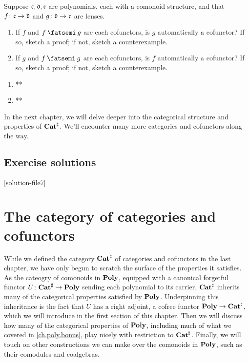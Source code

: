 \documentclass[Book-Poly]{subfiles}
\begin{document}
\begin{exercise}
Suppose $\mathfrak{c},\mathfrak{d},\mathfrak{e}$ are polynomials, each with a comonoid structure, and that $f\colon\mathfrak{c}\to\mathfrak{d}$ and $g\colon\mathfrak{d}\to\mathfrak{e}$ are lenses.
\begin{enumerate}
	\item If $f$ and $f\then g$ are each cofunctors, is $g$ automatically a cofunctor?
	If so, sketch a proof; if not, sketch a counterexample.
	\item If $g$ and $f\then g$ are each cofunctors, is $f$ automatically a cofunctor?
	If so, sketch a proof; if not, sketch a counterexample.
\qedhere
\end{enumerate}
\begin{solution}
\begin{enumerate}
    \item **
    \item **
\end{enumerate}
\end{solution}
\end{exercise}

In the next chapter, we will delve deeper into the categorical structure and properties of $\mathbf{Cat}^\sharp$.
We'll encounter many more categories and cofunctors along the way.

\section{Exercise solutions}
{\footnotesize
}

[solution-file7]

\chapter{The category of categories and cofunctors} \label{ch.comon.cofree}

While we defined the category $\mathbf{Cat}^\sharp$ of categories and cofunctors in the last chapter, we have only begun to scratch the surface of the properties it satisfies.
As the cateogry of comonoids in $\mathbf{Poly}$, equipped with a canonical forgetful functor $U\colon\mathbf{Cat}^\sharp\to\mathbf{Poly}$ sending each polynomial to its carrier, $\mathbf{Cat}^\sharp$ inherits many of the categorical properties satisfied by $\mathbf{Poly}$.
Underpinning this inheritance is the fact that $U$ has a right adjoint, a cofree functor $\mathbf{Poly}\to\mathbf{Cat}^\sharp$, which we will introduce in the first section of this chapter.
Then we will discuss how many of the categorical properties of $\mathbf{Poly}$, including much of what we covered in \cref{ch.poly.bonus}, play nicely with restriction to $\mathbf{Cat}^\sharp$.
Finally, we will touch on other constructions we can make over the comonoids in $\mathbf{Poly}$, such as their comodules and coalgebras.
\end{document}
